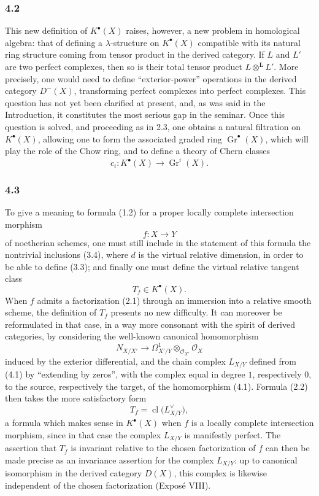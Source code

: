\documentclass[11pt]{article}
\newcommand{\Gr}{\operatorname{Gr}}
\newcommand{\cl}{\operatorname{cl}}
\begin{document}
\subsubsection*{4.2}
This new definition of $K^\bullet(X)$ raises, however, a new problem in homological algebra: that of defining a $\lambda$-structure on $K^\bullet(X)$ compatible with its natural ring structure coming from tensor product in the derived category. If $L$ and $L'$ are two perfect complexes, then so is their total tensor product $L\otimes^{\mathbf L}L'$. More precisely, one would need to define ``exterior-power'' operations in the derived category $D^-(X)$, transforming perfect complexes into perfect complexes. This question has not yet been clarified at present, and, as was said in the Introduction, it constitutes the most serious gap in the seminar. Once this question is solved, and proceeding as in 2.3, one obtains a natural filtration on $K^\bullet(X)$, allowing one to form the associated graded ring $\Gr^\bullet(X)$, which will play the role of the Chow ring, and to define a theory of Chern classes
\[
c_i:K^\bullet(X)\longrightarrow \Gr^i(X).
\]

\subsubsection*{4.3}
To give a meaning to formula (1.2) for a proper locally complete intersection morphism
\[
f:X\longrightarrow Y
\]
of noetherian schemes, one must still include in the statement of this formula the nontrivial inclusions (3.4), where $d$ is the virtual relative dimension, in order to be able to define (3.3); and finally one must define the virtual relative tangent class
\[
T_f\in K^\bullet(X).
\]
When $f$ admits a factorization (2.1) through an immersion into a relative smooth scheme, the definition of $T_f$ presents no new difficulty. It can moreover be reformulated in that case, in a way more consonant with the spirit of derived categories, by considering the well-known canonical homomorphism
\begin{equation}\tag{4.1}
N_{X/X'}\longrightarrow \Omega^1_{X'/Y}\otimes_{\mathcal O_{X'}}\mathcal O_X
\end{equation}
induced by the exterior differential, and the chain complex $L_{X/Y}$ defined from (4.1) by ``extending by zeros'', with the complex equal in degree $1$, respectively $0$, to the source, respectively the target, of the homomorphism (4.1). Formula (2.2) then takes the more satisfactory form
\begin{equation}\tag{4.2}
T_f=\cl\bigl(L_{X/Y}^{\vee}\bigr),
\end{equation}
a formula which makes sense in $K^\bullet(X)$ when $f$ is a locally complete intersection morphism, since in that case the complex $L_{X/Y}$ is manifestly perfect. The assertion that $T_f$ is invariant relative to the chosen factorization of $f$ can then be made precise as an invariance assertion for the complex $L_{X/Y}$: up to canonical isomorphism in the derived category $D(X)$, this complex is likewise independent of the chosen factorization (Expos\'e VIII).
\end{document}
